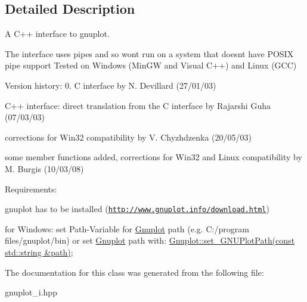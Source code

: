 \subsection{Detailed Description}
A C++ interface to gnuplot. 

The interface uses pipes and so won\textquotesingle{}t run on a system that doesn\textquotesingle{}t have P\+O\+S\+IX pipe support Tested on Windows (Min\+GW and Visual C++) and Linux (G\+CC)

Version history\+: 0. C interface by N. Devillard (27/01/03)
\begin{DoxyEnumerate}
\item C++ interface\+: direct translation from the C interface by Rajarshi Guha (07/03/03)
\item corrections for Win32 compatibility by V. Chyzhdzenka (20/05/03)
\item some member functions added, corrections for Win32 and Linux compatibility by M. Burgis (10/03/08)
\end{DoxyEnumerate}

Requirements\+:
\begin{DoxyItemize}
\item gnuplot has to be installed (\href{http://www.gnuplot.info/download.html}{\tt http\+://www.\+gnuplot.\+info/download.\+html})
\item for Windows\+: set Path-\/\+Variable for \hyperlink{classGnuplot}{Gnuplot} path (e.\+g. C\+:/program files/gnuplot/bin) or set \hyperlink{classGnuplot}{Gnuplot} path with\+: \hyperlink{classGnuplot_a67cae885c26ced821e335d98986f1967}{Gnuplot\+::set\+\_\+\+G\+N\+U\+Plot\+Path(const std\+::string \&path)}; 
\end{DoxyItemize}

The documentation for this class was generated from the following file\+:\begin{DoxyCompactItemize}
\item 
gnuplot\+\_\+i.\+hpp\end{DoxyCompactItemize}
